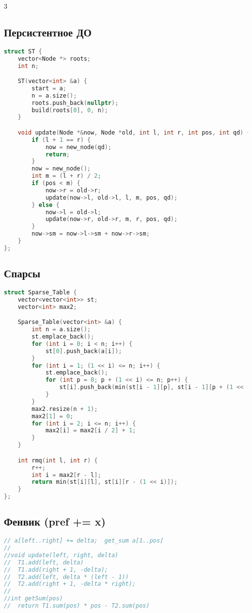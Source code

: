 \documentclass[10pt,a4paper,landscape,twosided]{extarticle}
\begin{document}
\begin{multicols*}{3}
\subsection{Персистентное ДО}
\begin{lstlisting}[language=C++]
struct ST {
    vector<Node *> roots;
    int n;

    ST(vector<int> &a) {
        start = a;
        n = a.size();
        roots.push_back(nullptr);
        build(roots[0], 0, n);
    }

    void update(Node *&now, Node *old, int l, int r, int pos, int qd) {
        if (l + 1 == r) {
            now = new_node(qd);
            return;
        }
        now = new_node();
        int m = (l + r) / 2;
        if (pos < m) {
            now->r = old->r;
            update(now->l, old->l, l, m, pos, qd);
        } else {
            now->l = old->l;
            update(now->r, old->r, m, r, pos, qd);
        }
        now->sm = now->l->sm + now->r->sm;
    }
};

\end{lstlisting}

\subsection{Спарсы}
\begin{lstlisting}[language=C++]
struct Sparse_Table {
    vector<vector<int>> st;
    vector<int> max2;

    Sparse_Table(vector<int> &a) {
        int n = a.size();
        st.emplace_back();
        for (int i = 0; i < n; i++) {
            st[0].push_back(a[i]);
        }
        for (int i = 1; (1 << i) <= n; i++) {
            st.emplace_back();
            for (int p = 0; p + (1 << i) <= n; p++) {
                st[i].push_back(min(st[i - 1][p], st[i - 1][p + (1 << (i - 1))]));
            }
        }
        max2.resize(n + 1);
        max2[1] = 0;
        for (int i = 2; i <= n; i++) {
            max2[i] = max2[i / 2] + 1;
        }
    }

    int rmq(int l, int r) {
        r++;
        int i = max2[r - l];
        return min(st[i][l], st[i][r - (1 << i)]);
    }
};

\end{lstlisting}

\subsection{Фенвик (pref += x)}
\begin{lstlisting}[language=C++]
// a[left..right] += delta;  get_sum a[1..pos]
//
//void update(left, right, delta)
//  T1.add(left, delta)
//  T1.add(right + 1, -delta);
//  T2.add(left, delta * (left - 1))
//  T2.add(right + 1, -delta * right);
//
//int getSum(pos)
//  return T1.sum(pos) * pos - T2.sum(pos)


\end{lstlisting}
\end{multicols*}
\end{document}
